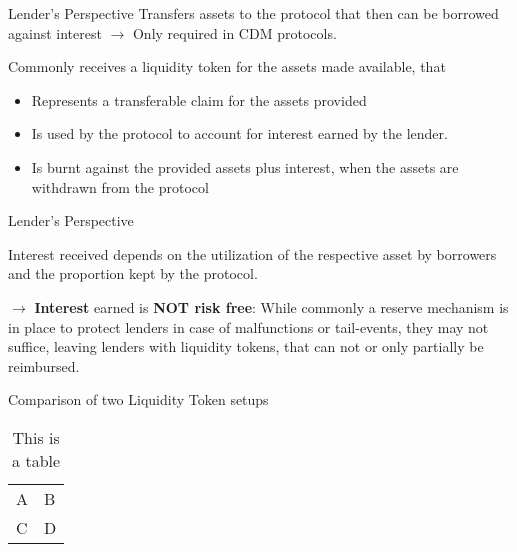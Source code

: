 \documentclass[handout]{beamer}
\begin{document}
\begin{frame}{Lender's Perspective}
Transfers assets to the protocol that then can be borrowed against interest $\rightarrow$  Only required in CDM protocols.

\vspace{1em}

Commonly receives a liquidity token for the assets made available, that

\vspace{1em}

\begin{itemize}
  \item Represents a transferable claim for the assets provided
  \item Is used by the protocol to account for interest earned by the lender.
  \item Is burnt against the provided assets plus interest, when the assets are withdrawn from the protocol
\end{itemize}


\end{frame}


\begin{frame}{Lender's Perspective}

Interest received depends on the utilization of the respective asset by borrowers and the proportion kept by the protocol.
\vspace{2em}

$\rightarrow $ \textbf{Interest} earned is \textbf{NOT risk free}: While commonly a reserve mechanism is in place to protect lenders in case of malfunctions or tail-events, they may not suffice, leaving lenders with liquidity tokens, that can not or only partially be reimbursed.


\end{frame}



\begin{frame}{Comparison of two Liquidity Token setups}

	\begin{table}
		\begin{tabular}{ll}
			A & B\\
			C & D
		\end{tabular}
		\caption{This is a table}
		\label{tbl:simpletable}
	\end{table}
	
\end{frame}
\end{document}
